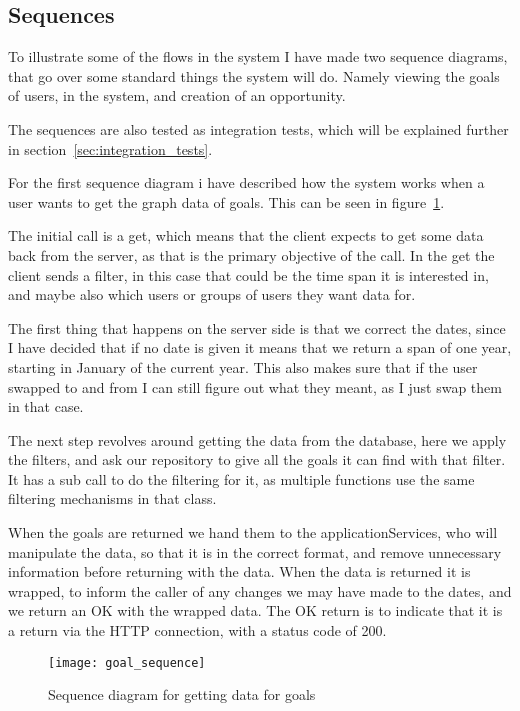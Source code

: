 \subsection{Sequences}
\label{subsec:sequences}
To illustrate some of the flows in the system I have made two sequence diagrams,
that go over some standard things the system will do. Namely viewing the goals
of users, in the system, and creation of an opportunity.

The sequences are also tested as integration tests, which will be explained
further in section~\ref{sec:integration_tests}.

For the first sequence diagram i have described how the system works when a user
wants to get the graph data of goals. This can be seen in
figure~\ref{fig:goal_sequence}.

The initial call is a get, which means that the client expects to get some data
back from the server, as that is the primary objective of the call. In the get
the client sends a filter, in this case that could be the time span it is
interested in, and maybe also which users or groups of users they want data for.

The first thing that happens on the server side is that we correct the dates,
since I have decided that if no date is given it means that we return a span of
one year, starting in January of the current year. This also makes sure that if
the user swapped to and from I can still figure out what they meant, as I just
swap them in that case. 

The next step revolves around getting the data from the database, here we apply
the filters, and ask our repository to give all the goals it can find with that
filter. It has a sub call to do the filtering for it, as multiple functions use
the same filtering mechanisms in that class.

When the goals are returned we hand them to the applicationServices, who will
manipulate the data, so that it is in the correct format, and remove unnecessary
information before returning with the data. When the data is returned it is
wrapped, to inform the caller of any changes we may have made to the dates, and
we return an OK with the wrapped data. The OK return is to indicate that it is a
return via the HTTP connection, with a status code of 200.

\begin{figure}[!htbp]
\centering
\texttt{[image: goal\_sequence]}
\caption{Sequence diagram for getting data for goals}
\label{fig:goal_sequence}
\end{figure}

